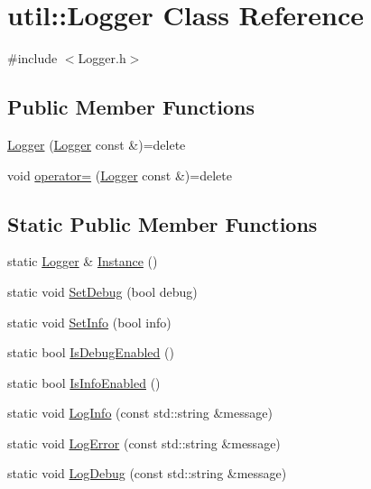 \hypertarget{classutil_1_1Logger}{}\section{util\+:\+:Logger Class Reference}
\label{classutil_1_1Logger}


{\ttfamily \#include $<$Logger.\+h$>$}

\subsection*{Public Member Functions}
\begin{DoxyCompactItemize}
\item 
\hyperlink{classutil_1_1Logger_a83d4f38e648b39fa61a2b9b3172bda12}{Logger} (\hyperlink{classutil_1_1Logger}{Logger} const \&)=delete
\item 
void \hyperlink{classutil_1_1Logger_a4e9e8b8d0e75058265037976d9b256de}{operator=} (\hyperlink{classutil_1_1Logger}{Logger} const \&)=delete
\end{DoxyCompactItemize}
\subsection*{Static Public Member Functions}
\begin{DoxyCompactItemize}
\item 
static \hyperlink{classutil_1_1Logger}{Logger} \& \hyperlink{classutil_1_1Logger_a734bbf94e1232706f7c0bf52745cc876}{Instance} ()
\item 
static void \hyperlink{classutil_1_1Logger_ac7b9bc580a6d459c212c46b137742869}{Set\+Debug} (bool debug)
\item 
static void \hyperlink{classutil_1_1Logger_a3965358e412007989f90798e295d4b41}{Set\+Info} (bool info)
\item 
static bool \hyperlink{classutil_1_1Logger_a6ee9298451936b98815e20ba7f5d7275}{Is\+Debug\+Enabled} ()
\item 
static bool \hyperlink{classutil_1_1Logger_a194b338af92760d0f7d15b607cad5429}{Is\+Info\+Enabled} ()
\item 
static void \hyperlink{classutil_1_1Logger_a37504d39ec90bebffc3d02d61d47afea}{Log\+Info} (const std\+::string \&message)
\item 
static void \hyperlink{classutil_1_1Logger_a01ad6e5349f51964724f96a598c6d2a8}{Log\+Error} (const std\+::string \&message)
\item 
static void \hyperlink{classutil_1_1Logger_a9c6a0ebe97ecf3ca24aff8a908a491ee}{Log\+Debug} (const std\+::string \&message)
\end{DoxyCompactItemize}


